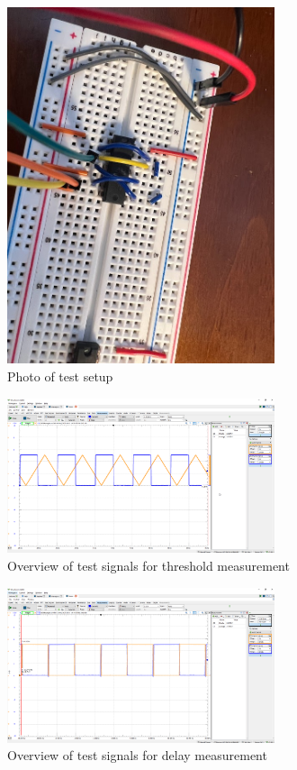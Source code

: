 \documentclass{article}
\begin{document}
	\begin{figure}[H]
	    \centering
	    \includegraphics[width=0.7\textwidth]{2b-photo}
	    \caption{Photo of test setup}
	\end{figure}
	
	\begin{figure}[H]
	    \centering
	    \includegraphics[width=0.7\textwidth]{2b-1-lab}
	    \caption{Overview of test signals for threshold measurement}
	\end{figure}
	
	\begin{figure}[H]
	    \centering
	    \includegraphics[width=0.7\textwidth]{2b-1-delay-lab}
	    \caption{Overview of test signals for delay measurement}
	\end{figure}
	
\end{document}
